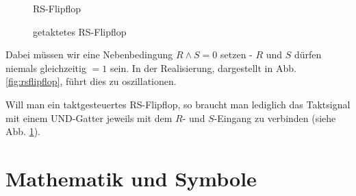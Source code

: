\documentclass[12pt, a4paper, twopage]{scrartcl}
\begin{document}
\begin{figure}[h!]
\centering
    \caption{RS-Flipflop}%
    \label{fig:rsflipflop}
  \endminipage\hspace{1cm}   
%
    \caption{getaktetes RS-Flipflop}%
    \label{fig:rsflipfloptakt}
  \endminipage
\end{figure}

Dabei müssen wir eine Nebenbedingung $R \wedge S = 0$ setzen - $R$ und $S$ dürfen niemals gleichzeitig $= 1$ sein. In der Realisierung, dargestellt in Abb. \ref{fig:rsflipflop}, führt dies zu oszillationen. 

Will man ein taktgesteuertes RS-Flipflop, so braucht man lediglich das Taktsignal mit einem UND-Gatter jeweils mit dem $R$- und $S$-Eingang zu verbinden (siehe Abb. \ref{fig:rsflipfloptakt}).













\section{Mathematik und Symbole}
\end{document}

